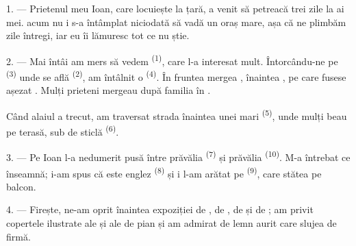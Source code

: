 %

\VUsaut{4.0mm}
\VUsaut{3.0mm}

\VUsaut{3.0mm}

1. --- Prietenul meu Ioan, care locuiește la țară, a venit să petreacă trei zile la
ai mei.  acum nu i s-a întâmplat niciodată să vadă un oraș mare, așa
că ne plimbăm zile întregi, iar eu îi lămuresc tot ce nu știe.

2. --- Mai întâi am mers să vedem  \textsuperscript{(1)}, care
l-a interesat mult. Întorcându-ne pe  \textsuperscript{(3)} unde se
află  \textsuperscript{(2)}, am întâlnit o
 \textsuperscript{(4)}. În fruntea 
mergea , înaintea , pe care fusese așezat
. Mulți prieteni mergeau după familia în .

Când alaiul a trecut, am traversat strada înaintea unei  mari
\textsuperscript{(5)}, unde mulți  beau  pe terasă,
sub  de sticlă \textsuperscript{(6)}.

3. --- Pe Ioan l-a nedumerit  pusă între prăvălia  \textsuperscript{(7)} și prăvălia  \textsuperscript{(10)}. M-a întrebat ce înseamnă; i-am spus că este
 englez \textsuperscript{(8)} și i l-am arătat pe
 \textsuperscript{(9)}, care stătea pe balcon.

\VUsaut{3.0mm}

4. --- Firește, ne-am oprit înaintea expoziției de ,
de , de  și de ; am privit copertele
ilustrate ale  și ale  de pian și am admirat
 de lemn aurit care slujea de firmă.

